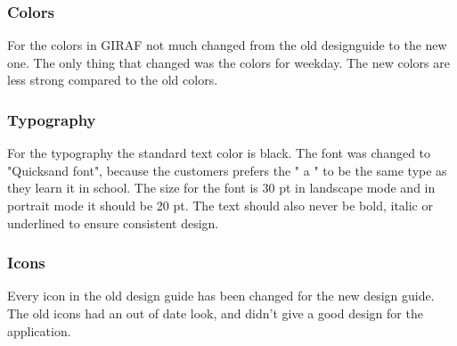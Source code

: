 \subsubsection{Colors}
For the colors in GIRAF not much changed from the old designguide to the new one. 
The only thing that changed was the colors for weekday.
The new colors are less strong compared to the old colors.

\subsubsection{Typography}
For the typography the standard text color is black. The font was changed to "Quicksand font", because the customers prefers the " a " to be the same type as they learn it in school.
The size for the font is 30 pt in landscape mode and in portrait mode it should be 20 pt.
The text should also never be bold, italic or underlined to ensure consistent design.

\subsubsection{Icons}
Every icon in the old design guide has been changed for the new design guide.
The old icons had an out of date look, and didn't give a good design for the application.
